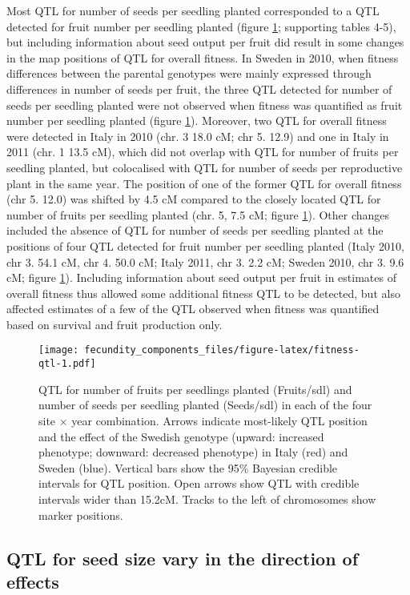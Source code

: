 \documentclass[12pt,]{article}
\begin{document}
Most QTL for number of seeds per seedling planted corresponded to a QTL detected for fruit number per seedling planted (figure \ref{fig:fitness-qtl}; supporting tables 4-5), but including information about seed output per fruit did result in some changes in the map positions of QTL for overall fitness.
In Sweden in 2010, when fitness differences between the parental genotypes were mainly expressed through differences in number of seeds per fruit, the three QTL detected for number of seeds per seedling planted were not observed when fitness was quantified as fruit number per seedling planted (figure \ref{fig:fitness-qtl}).
Moreover, two QTL for overall fitness were detected in Italy in 2010 (chr. 3 18.0 cM; chr 5. 12.9) and one in Italy in 2011 (chr. 1 13.5 cM), which did not overlap with QTL for number of fruits per seedling planted, but colocalised with QTL for number of seeds per reproductive plant in the same year.
The position of one of the former QTL for overall fitness (chr 5. 12.0) was shifted by 4.5 cM compared to the closely located QTL for number of fruits per seedling planted (chr. 5, 7.5 cM; figure \ref{fig:fitness-qtl}).
Other changes included the absence of QTL for number of seeds per seedling planted at the positions of four QTL detected for fruit number per seedling planted (Italy 2010, chr 3. 54.1 cM, chr 4. 50.0 cM; Italy 2011, chr 3. 2.2 cM; Sweden 2010, chr 3. 9.6 cM; figure \ref{fig:fitness-qtl}). Including information about seed output per fruit in estimates of overall fitness thus allowed some additional fitness QTL to be detected, but also affected estimates of a few of the QTL observed when fitness was quantified based on survival and fruit production only.

\begin{figure}
\centering
\texttt{[image: fecundity\_components\_files/figure-latex/fitness-qtl-1.pdf]}
\caption{\label{fig:fitness-qtl}QTL for number of fruits per seedlings planted (Fruits/sdl) and number of seeds per seedling planted (Seeds/sdl) in each of the four site × year combination. Arrows indicate most-likely QTL position and the effect of the Swedish genotype (upward: increased phenotype; downward: decreased phenotype) in Italy (red) and Sweden (blue). Vertical bars show the 95\% Bayesian credible intervals for QTL position. Open arrows show QTL with credible intervals wider than 15.2cM. Tracks to the left of chromosomes show marker positions.}
\end{figure}

\hypertarget{qtl-for-seed-size-vary-in-the-direction-of-effects}{%
\subsection{QTL for seed size vary in the direction of effects}\label{qtl-for-seed-size-vary-in-the-direction-of-effects}}
\end{document}
